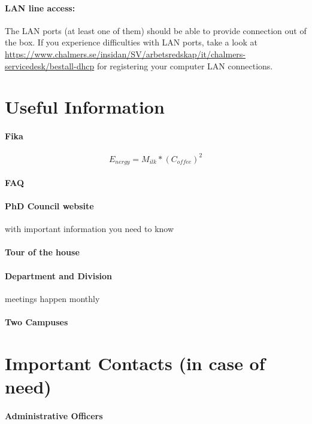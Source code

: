 \documentclass[acmtog]{acmart}
\begin{document}
\paragraph{LAN line access:}

The LAN ports (at least one of them) should be able to provide connection out of the box. 
If you experience difficulties with LAN ports, take a look at \url{https://www.chalmers.se/insidan/SV/arbetsredskap/it/chalmers-servicedesk/bestall-dhcp} for registering your computer LAN connections. 


\section{Useful Information}
\paragraph{Fika}
\begin{equation}
E_{nergy} = M_{ilk} * (C_{offee})^2
\end{equation}


\paragraph{FAQ}

\paragraph{PhD Council website}
with important information you need to know 

\paragraph{Tour of the house}

\paragraph{Department and Division}
meetings happen monthly

\paragraph{Two Campuses}

\section{Important Contacts (in case of need)}
\paragraph{Administrative Officers}
\end{document}
